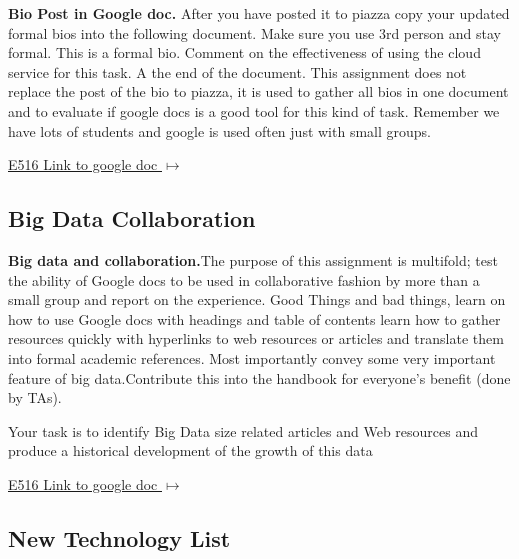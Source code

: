\begin{exercise} \label{E:bio-googledocs}

 {\bf Bio Post in Google doc.} After you have posted it to piazza copy your updated formal bios into the following document.  Make sure you use 3rd person and stay formal. This is a formal bio. Comment on the effectiveness of using the cloud service for this task. A the end of the document. This assignment does not replace the post of the bio to piazza, it is used to gather all bios in one document and to evaluate if google docs is a good tool for this kind of task. Remember we have lots of students and google is used often just with small groups.
 
 \smallskip

 {\hfill \href{https://docs.google.com/document/d/1ejzlKYqC3dLac8WXVpcPQsJh1j4BDqRxxgGg1cFQbeQ/edit?usp=sharing}{E516 Link to google doc $\mapsto$}}

 \end{exercise}

\subsection{Big Data Collaboration}

\begin{exercise} \label{E:big-data-and-collaboration}
{\bf Big data and collaboration.}The purpose of this assignment is multifold; test the ability of Google docs to be used in collaborative fashion by more than a small group and report on the experience. Good Things and bad things, learn on how to use Google docs with headings and table of contents learn how to gather resources quickly with hyperlinks to web resources or articles and translate them into formal academic references. Most importantly convey some very important feature of big data.Contribute this into the handbook for everyone's benefit (done by TAs).
\smallskip

 Your task is to identify Big Data size related articles and Web resources and produce a historical development of the growth of this data

  {\hfill \href{https://docs.google.com/document/d/1ZHNdhX_Jx7uBQo0kthSYQ6TQR8_KNbgOwH2EuqBQcjY/edit?usp=sharing}{E516 Link to google doc $\mapsto$}}



\end{exercise}



\subsection{New Technology List}

